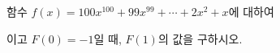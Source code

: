 함수 $f(x)=100x^{100}+99x^{99}+\cdots+2x^2+x$에 대하여\par\smallskip{}\par\smallskip\noindent 이고 $F(0)=-1$일 때, $F(1)$의 값을 구하시오.
